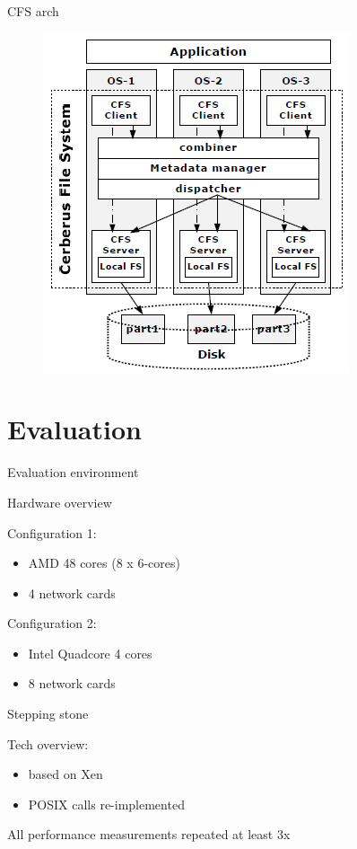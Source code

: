 \documentclass{beamer}
\begin{document}
	\begin{frame}{CFS arch}

		\begin{figure} [H]
			\centering
			\includegraphics[scale=0.45]{img/cerberus-cfs}
		\end{figure}	

	\end{frame}

\section{Evaluation}

	\begin{frame}{Evaluation environment}

	Hardware overview
	
	Configuration 1:
	\begin{itemize}
	\item AMD 48 cores (8 x 6-cores) 
	\item 4 network cards
	\end{itemize}	

	Configuration 2:
	\begin{itemize}
	\item Intel Quadcore 4 cores
	\item 8 network cards
	\end{itemize}	
	\end{frame}

	\begin{frame}{Stepping stone}
	
	Tech overview:
	\begin{itemize}
	\item based on Xen
	\item POSIX calls re-implemented
	\end{itemize}

	All performance measurements repeated at least 3x

	\end{frame}
\end{document}

